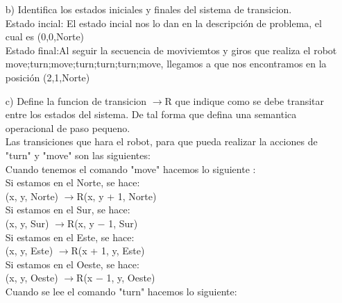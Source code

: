 \documentclass{article}
\begin{document}
\begin{itemize}
\begin{itemize}
                    \item[b)] Identifica los estados iniciales y finales del sistema de transicion.\\

                    Estado incial: El estado incial nos lo dan en la descripción de problema, el cual es (0,0,Norte)\\

                    Estado final:Al seguir la secuencia de moviviemtos y giros que realiza el robot move;turn;move;turn;turn;turn;move, llegamos a que nos encontramos en la posición (2,1,Norte)\\
                    
                    \item[c)] Define la funcion de transicion $\rightarrow$R que indique como se debe transitar entre los estados del sistema. De tal forma que defina una semantica operacional de paso pequeno.\\

                    Las transiciones que hara el robot, para que pueda realizar la acciones de "turn" y "move" son las siguientes:\\
                    
                    Cuando tenemos el comando "move" hacemos lo siguiente :\\
                    
                    Si estamos en el Norte, se hace:\\
                    (x, y, Norte) $\rightarrow$R(x, y + 1, Norte)\\
                    Si estamos en el Sur, se hace:\\
                    (x, y, Sur) $\rightarrow$R(x, y − 1, Sur)\\
                    Si estamos en el Este, se hace:\\
                    (x, y, Este) $\rightarrow$R(x + 1, y, Este)\\
                    Si estamos en el Oeste, se hace:\\
                    (x, y, Oeste) $\rightarrow$R(x − 1, y, Oeste)\\

                    Cuando se lee el comando "turn" hacemos lo siguiente:\\


\end{itemize}
\end{itemize}
\end{document}
